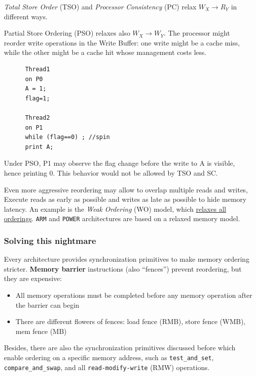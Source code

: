 \begin{paracol}{2}
   \colfill
   \textit{Total Store Order} (TSO) and \textit{Processor Consistency} (PC) relax $W_X \rightarrow R_Y$ in different ways.
   \nl
   
   Partial Store Ordering (PSO) relaxes also $W_X \rightarrow W_Y$.
   The processor might reorder write operations in the Write Buffer: one write might be a cache miss, while the other might be a cache hit whose management costs less.
   \colfill
   
   \switchcolumn

   \begin{lstlisting}
      Thread1
      on P0
      A = 1;
      flag=1;
      
      Thread2
      on P1
      while (flag==0) ; //spin
      print A;
   \end{lstlisting}

   Under PSO, P1 may observe the flag change before the write to A is visible, hence printing 0.
   This behavior would not be allowed by TSO and SC.
\end{paracol}

Even more aggressive reordering may allow to overlap multiple reads and writes, Execute reads as early as possible and writes as late as possible to hide memory latency.
An example is the \textit{Weak Ordering} (WO) model, which \ul{relaxes all orderings}.
\texttt{ARM} and \texttt{POWER} architectures are based on a relaxed memory model.

\subsubsection{Solving this nightmare}
Every architecture provides synchronization primitives to make memory ordering stricter.
\textbf{Memory barrier} instructions (also ``fences'') prevent reordering, but they are expensive:
\begin{itemize}
   \item All memory operations must be completed before any memory operation after the barrier can begin
   \item There are different flowers of fences: load fence (RMB), store fence (WMB), mem fence (MB)
\end{itemize}
Besides, there are also the synchronization primitives discussed before which enable ordering on a specific memory address, such as \lstinline|test_and_set|, \lstinline|compare_and_swap|, and all \lstinline|read-modify-write| (RMW) operations.

